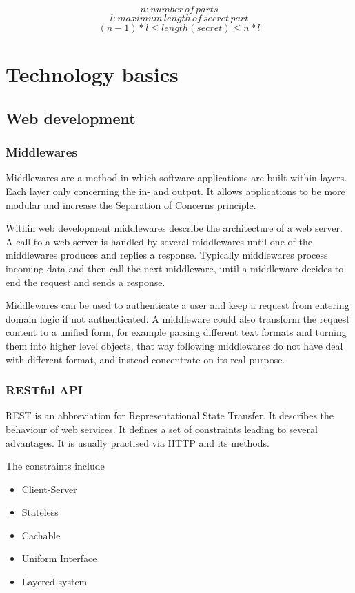 $$n: number\,of\,parts$$
$$l: maximum\,length\,of\,secret\,part$$
$$(n - 1) * l \leq length(secret) \leq n * l$$

\chapter{Technology basics}
\section{Web development}
\subsection{Middlewares}

Middlewares are a method in which software applications are built within
layers. Each layer only concerning the in- and output. It allows applications
to be more modular and increase the Separation of Concerns principle.

Within web development middlewares describe the architecture of a web server.  A
call to a web server is handled by several middlewares until one of the
middlewares produces and replies a response. Typically middlewares process
incoming data and then call the next middleware, until a middleware decides to
end the request and sends a response.

Middlewares can be used to authenticate a user and keep a request from entering
domain logic if not authenticated. A middleware could also transform the
request content to a unified form, for example parsing different text formats
and turning them into higher level objects, that way following middlewares do
not have deal with different format, and instead concentrate on its real
purpose.

\subsection{RESTful API}

REST is an abbreviation for Representational State Transfer. It describes the
behaviour of web services. It defines a set of constraints leading to several
advantages. It is usually practised via HTTP and its methods.

The constraints include

\begin{itemize}
  \item{Client-Server}
  \item{Stateless}
  \item{Cachable}
  \item{Uniform Interface}
  \item{Layered system}
\end{itemize}

